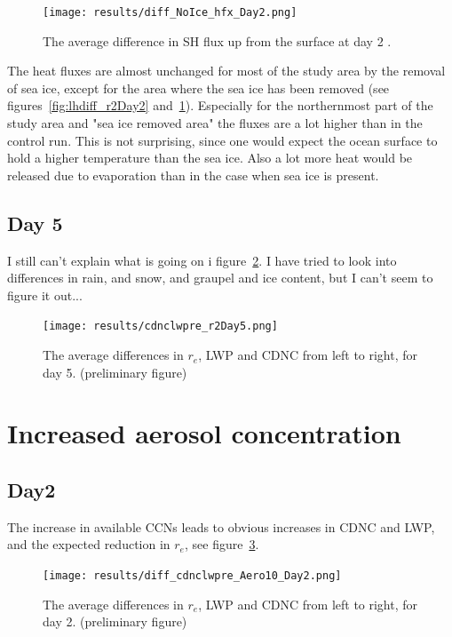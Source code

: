 \begin{figure}
\centering
\texttt{[image: results/diff\_NoIce\_hfx\_Day2.png]}
\caption{The average difference in SH flux up from the surface at day 2 .}
\label{fig:shdiff_r2Day2}
\end{figure}

The heat fluxes are almost unchanged for most of the study area by the removal of sea ice, except for the area where the sea ice has been removed (see figures~\ref{fig:lhdiff_r2Day2} and~\ref{fig:shdiff_r2Day2}). Especially for the northernmost part of the study area and "sea ice removed area" the fluxes are a lot higher than in the control run. This is not surprising, since one would expect the ocean surface to hold a higher temperature than the sea ice. Also a lot more heat would be released due to evaporation than in the case when sea ice is present.

\subsection{Day 5}
I still can't explain what is going on i figure~\ref{fig:relwpcdnc_r2Day5}. I have tried to look into differences in rain, and snow, and graupel and ice content, but I can't seem to figure it out...
\begin{figure}[h!]
\centering
\texttt{[image: results/cdnclwpre\_r2Day5.png]}
\caption{The average differences in $r_e$, LWP and CDNC from left to right, for day 5. (preliminary figure)}
\label{fig:relwpcdnc_r2Day5}
\end{figure}

\section{Increased aerosol concentration}
\subsection{Day2}
The increase in available CCNs leads to obvious increases in CDNC and LWP, and the expected reduction in $r_e$, see figure~\ref{fig:cdnclwpre_Aero10}.%
\begin{figure}[h!]
\centering
\texttt{[image: results/diff\_cdnclwpre\_Aero10\_Day2.png]}
\caption{The average differences in $r_e$, LWP and CDNC from left to right, for day 2. (preliminary figure)}
\label{fig:cdnclwpre_Aero10}
\end{figure}

